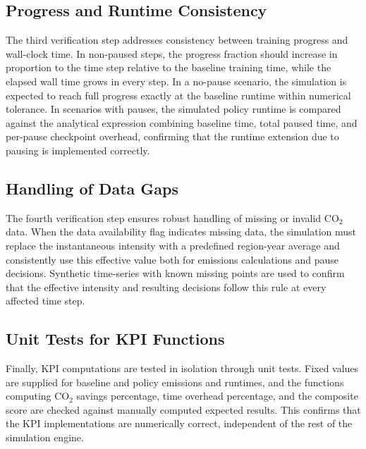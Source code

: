 \subsection{Progress and Runtime Consistency}

The third verification step addresses consistency between training progress
and wall-clock time. In non-paused steps, the progress fraction should
increase in proportion to the time step relative to the baseline training
time, while the elapsed wall time grows in every step. In a no-pause
scenario, the simulation is expected to reach full progress exactly at the
baseline runtime within numerical tolerance. In scenarios with pauses, the
simulated policy runtime is compared against the analytical expression
combining baseline time, total paused time, and per-pause checkpoint
overhead, confirming that the runtime extension due to pausing is implemented
correctly.

\subsection{Handling of Data Gaps}

The fourth verification step ensures robust handling of missing or invalid
CO$_2$ data. When the data availability flag indicates missing data, the
simulation must replace the instantaneous intensity with a predefined
region-year average and consistently use this effective value both for
emissions calculations and pause decisions. Synthetic time-series with known
missing points are used to confirm that the effective intensity and resulting
decisions follow this rule at every affected time step.

\subsection{Unit Tests for KPI Functions}

Finally, KPI computations are tested in isolation through unit tests. Fixed
values are supplied for baseline and policy emissions and runtimes, and the
functions computing CO$_2$ savings percentage, time overhead percentage, and
the composite score are checked against manually computed expected results.
This confirms that the KPI implementations are numerically correct,
independent of the rest of the simulation engine.
